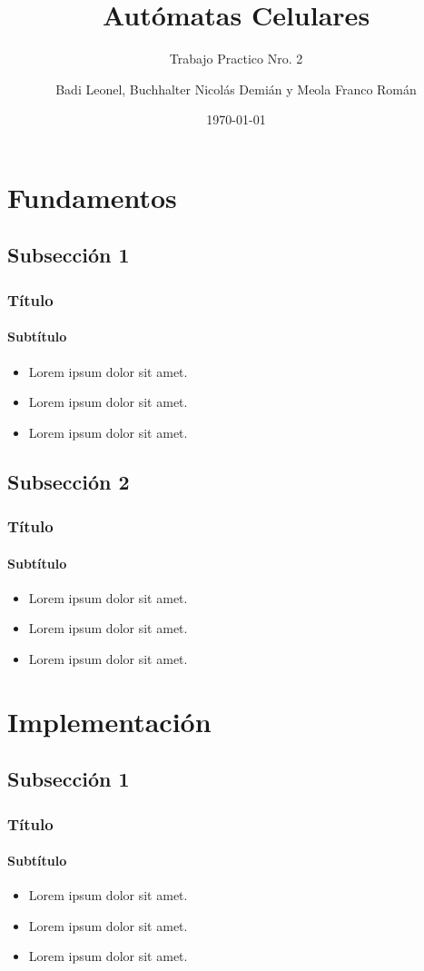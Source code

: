 \documentclass[hyperref={pdfpagelayout=SinglePage}]{beamer}
\title{Autómatas Celulares}
\subtitle{Trabajo Practico Nro. 2}
\author{Badi Leonel, Buchhalter Nicolás Demián y Meola Franco Román}
\date{\today}
\begin{document}
\renewcommand{\figurename}{Grafico}

\begin{frame}[plain]
    \frametitle{} 
    \titlepage
\end{frame}

\section{Fundamentos}

\subsection{Subsección 1}

\begin{frame}
\frametitle{Título}
\framesubtitle{Subtítulo}
\begin{itemize}
	\item Lorem ipsum dolor sit amet.
	\item Lorem ipsum dolor sit amet.
	\item Lorem ipsum dolor sit amet.
\end{itemize}
\end{frame}

\subsection{Subsección 2}

\begin{frame}
\frametitle{Título}
\framesubtitle{Subtítulo}
\begin{itemize}
	\item Lorem ipsum dolor sit amet.
	\item Lorem ipsum dolor sit amet.
	\item Lorem ipsum dolor sit amet.
\end{itemize}
\end{frame}

\section{Implementación}

\subsection{Subsección 1}

\begin{frame}
\frametitle{Título}
\framesubtitle{Subtítulo}
\begin{itemize}
	\item Lorem ipsum dolor sit amet.
	\item Lorem ipsum dolor sit amet.
	\item Lorem ipsum dolor sit amet.
\end{itemize}
\end{frame}
\end{document}
